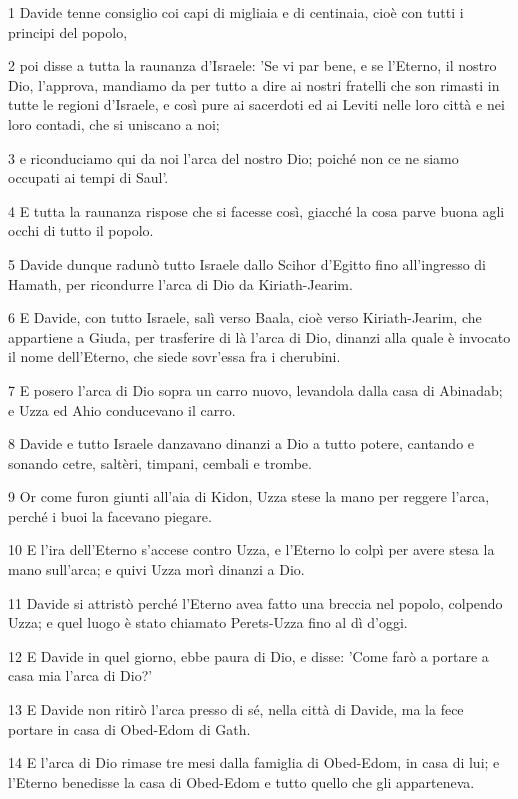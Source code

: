 \par 1 Davide tenne consiglio coi capi di migliaia e di centinaia, cioè con tutti i principi del popolo,
\par 2 poi disse a tutta la raunanza d'Israele: 'Se vi par bene, e se l'Eterno, il nostro Dio, l'approva, mandiamo da per tutto a dire ai nostri fratelli che son rimasti in tutte le regioni d'Israele, e così pure ai sacerdoti ed ai Leviti nelle loro città e nei loro contadi, che si uniscano a noi;
\par 3 e riconduciamo qui da noi l'arca del nostro Dio; poiché non ce ne siamo occupati ai tempi di Saul'.
\par 4 E tutta la raunanza rispose che si facesse così, giacché la cosa parve buona agli occhi di tutto il popolo.
\par 5 Davide dunque radunò tutto Israele dallo Scihor d'Egitto fino all'ingresso di Hamath, per ricondurre l'arca di Dio da Kiriath-Jearim.
\par 6 E Davide, con tutto Israele, salì verso Baala, cioè verso Kiriath-Jearim, che appartiene a Giuda, per trasferire di là l'arca di Dio, dinanzi alla quale è invocato il nome dell'Eterno, che siede sovr'essa fra i cherubini.
\par 7 E posero l'arca di Dio sopra un carro nuovo, levandola dalla casa di Abinadab; e Uzza ed Ahio conducevano il carro.
\par 8 Davide e tutto Israele danzavano dinanzi a Dio a tutto potere, cantando e sonando cetre, saltèri, timpani, cembali e trombe.
\par 9 Or come furon giunti all'aia di Kidon, Uzza stese la mano per reggere l'arca, perché i buoi la facevano piegare.
\par 10 E l'ira dell'Eterno s'accese contro Uzza, e l'Eterno lo colpì per avere stesa la mano sull'arca; e quivi Uzza morì dinanzi a Dio.
\par 11 Davide si attristò perché l'Eterno avea fatto una breccia nel popolo, colpendo Uzza; e quel luogo è stato chiamato Perets-Uzza fino al dì d'oggi.
\par 12 E Davide in quel giorno, ebbe paura di Dio, e disse: 'Come farò a portare a casa mia l'arca di Dio?'
\par 13 E Davide non ritirò l'arca presso di sé, nella città di Davide, ma la fece portare in casa di Obed-Edom di Gath.
\par 14 E l'arca di Dio rimase tre mesi dalla famiglia di Obed-Edom, in casa di lui; e l'Eterno benedisse la casa di Obed-Edom e tutto quello che gli apparteneva.

